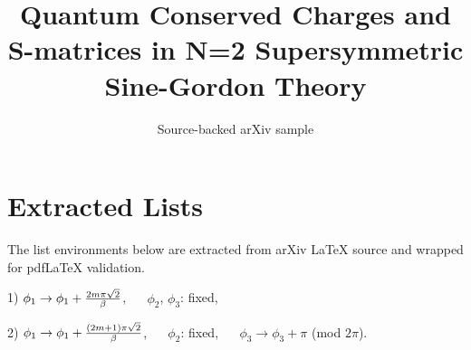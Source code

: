 \documentclass[11pt]{article}
\title{Quantum Conserved Charges and S-matrices in N=2 Supersymmetric
  Sine-Gordon Theory}
\author{Source-backed arXiv sample}
\date{}
\begin{document}
\maketitle
\section{Extracted Lists}

The list environments below are extracted from arXiv LaTeX source and wrapped for pdfLaTeX validation.

\begin{description}
\item{1)}
$\phi_1 \rightarrow \phi_1 + {{2m\pi\sqrt2}\over \beta}$, $\quad$ $\phi_2$,
 $\phi_3$: fixed,
\item{2)}
$\phi_1 \rightarrow \phi_1 + {{(2m+1)\pi\sqrt2}\over \beta}$, $\quad$
$\phi_2$: fixed,
$\quad$ $\phi_3 \rightarrow \phi_3 + \pi$ (mod $2\pi$).
\end{description}
\end{document}
